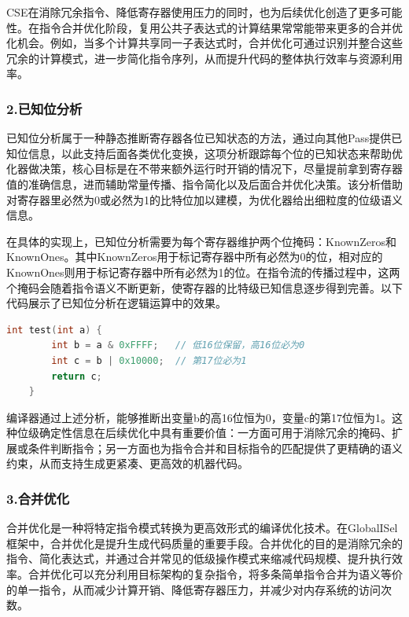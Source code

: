 \par

CSE在消除冗余指令、降低寄存器使用压力的同时，也为后续优化创造了更多可能性。在指令合并优化阶段，复用公共子表达式的计算结果常常能带来更多的合并优化机会。例如，当多个计算共享同一子表达式时，合并优化可通过识别并整合这些冗余的计算模式，进一步简化指令序列，从而提升代码的整体执行效率与资源利用率。


\subsubsection{2.已知位分析}
已知位分析属于一种静态推断寄存器各位已知状态的方法，通过向其他Pass提供已知位信息，以此支持后面各类优化变换，这项分析跟踪每个位的已知状态来帮助优化器做决策，核心目标是在不带来额外运行时开销的情况下，尽量提前拿到寄存器值的准确信息，进而辅助常量传播、指令简化以及后面合并优化决策。该分析借助对寄存器里必然为0或必然为1的比特位加以建模，为优化器给出细粒度的位级语义信息。

\par

在具体的实现上，已知位分析需要为每个寄存器维护两个位掩码：KnownZeros和KnownOnes。其中KnownZeros用于标记寄存器中所有必然为0的位，相对应的KnownOnes则用于标记寄存器中所有必然为1的位。在指令流的传播过程中，这两个掩码会随着指令语义不断更新，使寄存器的比特级已知信息逐步得到完善。以下代码展示了已知位分析在逻辑运算中的效果。

\lstset{language=c++}
\begin{lstlisting}[language=C++]
	int test(int a) {
		int b = a & 0xFFFF;   // 低16位保留，高16位必为0
		int c = b | 0x10000;  // 第17位必为1
		return c;
	}
\end{lstlisting}

编译器通过上述分析，能够推断出变量b的高16位恒为0，变量c的第17位恒为1。这种位级确定性信息在后续优化中具有重要价值：一方面可用于消除冗余的掩码、扩展或条件判断指令；另一方面也为指令合并和目标指令的匹配提供了更精确的语义约束，从而支持生成更紧凑、更高效的机器代码。


\subsubsection{3.合并优化}
合并优化是一种将特定指令模式转换为更高效形式的编译优化技术。在GlobalISel框架中，合并优化是提升生成代码质量的重要手段。合并优化的目的是消除冗余的指令、简化表达式，并通过合并常见的低级操作模式来缩减代码规模、提升执行效率。合并优化可以充分利用目标架构的复杂指令，将多条简单指令合并为语义等价的单一指令，从而减少计算开销、降低寄存器压力，并减少对内存系统的访问次数。


